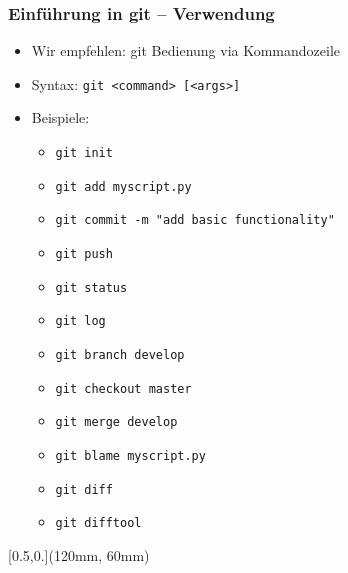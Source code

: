 \documentclass{beamer}
\begin{document}
\begin{frame}[label=gitintro10]
\frametitle{Einführung in git – Verwendung}
\begin{itemize}
 \item Wir empfehlen: git Bedienung via Kommandozeile
 \item Syntax: \texttt{git <command> [<args>]}
 \item Beispiele:

 \begin{itemize}
  \item \texttt{git init}
  \item \texttt{git add myscript.py}
  \item \texttt{git commit -m "{}add basic functionality"}
  \item \texttt{git push}\\[2mm]
  \pause
  \item \texttt{git status}
  \item \texttt{git log}
  \item \texttt{git branch develop}
  \item \texttt{git checkout master}
  \item \texttt{git merge develop}
  \item \texttt{git blame myscript.py}
  \item \texttt{git diff}
  \item \texttt{git difftool}

 \end{itemize}
\end{itemize}

\begin{textblock*}{\textwidth}[0.5,0.](120mm, 60mm)

\end{textblock*}

\end{frame}
\end{document}
